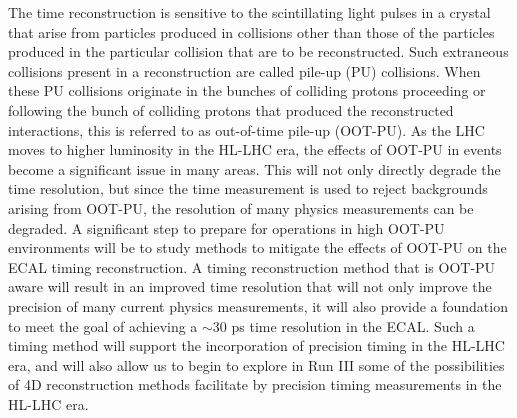 The time reconstruction is sensitive to the scintillating light pulses in a crystal that arise from particles produced in collisions other than those of the particles produced in the particular collision that are to be reconstructed. Such extraneous collisions present in a reconstruction are called pile-up (PU) collisions. When these PU collisions originate in the bunches of colliding protons proceeding or following the bunch of colliding protons that produced the reconstructed interactions, this is referred to as out-of-time pile-up (OOT-PU). As the LHC moves to higher luminosity in the HL-LHC era, the effects of OOT-PU in events become a significant issue in many areas.  This will not only directly degrade the time resolution, but since the time measurement is used to reject backgrounds arising from OOT-PU, the resolution of many physics measurements can be degraded. A significant step to prepare for operations in high OOT-PU environments will be to study methods to mitigate the effects of OOT-PU on the ECAL timing reconstruction.  A timing reconstruction method that is OOT-PU aware will result in an improved time resolution that will not only improve the precision of many current physics measurements, it will also provide a foundation to meet the goal of achieving a $\sim$30 ps time resolution in the ECAL. Such a timing method will support the incorporation of precision timing in the HL-LHC era, and will also allow us to begin to explore in Run III some of the possibilities of 4D reconstruction methods facilitate by precision timing measurements in the HL-LHC era.



